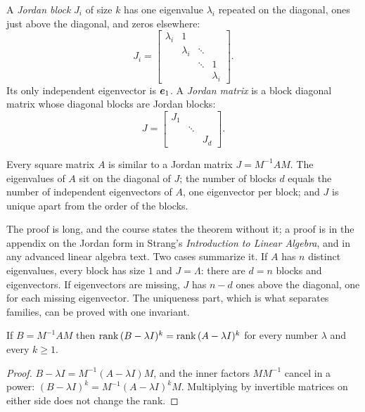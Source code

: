 \begin{definition}\label{def:u32-jordan}
A \emph{Jordan block} $J_i$ of size $k$ has one eigenvalue $\lambda_i$ repeated on the diagonal,
ones just above the diagonal, and zeros elsewhere:
\[
  J_i=\begin{bmatrix}\lambda_i&1&&\\&\lambda_i&\ddots&\\&&\ddots&1\\&&&\lambda_i\end{bmatrix}.
\]
Its only independent eigenvector is $\boldsymbol{e}_1$. A \emph{Jordan matrix} is a block diagonal matrix
whose diagonal blocks are Jordan blocks:
\[
  J=\begin{bmatrix}J_1&&\\&\ddots&\\&&J_d\end{bmatrix}.
\]
\end{definition}

\begin{theorem}\label{thm:u32-jordan}
Every square matrix $A$ is similar to a Jordan matrix $J=M^{-1}AM$. The eigenvalues of $A$ sit on
the diagonal of $J$; the number of blocks $d$ equals the number of independent eigenvectors of
$A$, one eigenvector per block; and $J$ is unique apart from the order of the blocks.
\end{theorem}

The proof is long, and the course states the theorem without it; a proof is in the appendix on
the Jordan form in Strang's \emph{Introduction to Linear Algebra}, and in any advanced linear
algebra text. Two cases summarize it.
If $A$ has $n$ distinct eigenvalues, every block has size $1$ and $J=\Lambda$: there are $d=n$
blocks and eigenvectors. If eigenvectors are missing, $J$ has $n-d$ ones above the diagonal,
one for each missing eigenvector. The uniqueness part, which is what separates families, can be
proved with one invariant.

\begin{proposition}\label{prop:u32-ranks}
If $B=M^{-1}AM$ then $\operatorname{rank}\,(B-\lambda I)^k=\operatorname{rank}\,(A-\lambda I)^k$ for every number $\lambda$ and every
$k\ge1$.
\end{proposition}
\begin{proof}
$B-\lambda I=M^{-1}(A-\lambda I)M$, and the inner factors $MM^{-1}$ cancel in a power:
$(B-\lambda I)^k=M^{-1}(A-\lambda I)^kM$. Multiplying by invertible matrices on either side does not
change the rank.
\end{proof}

